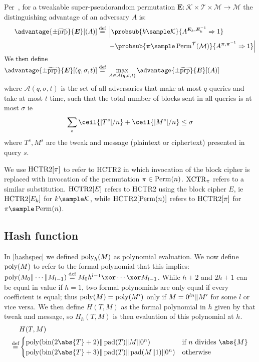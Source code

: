 \documentclass[hctr.tex]{subfiles}
\begin{document}
Per~\cite{cmc}, for a tweakable super-pseudorandom permutation
$\bm{E} : \mathcal{K} \times \mathcal{T} \times \mathcal{M} \rightarrow \mathcal{M}$
the distinguishing advantage of an adversary $A$ is:
%
\begin{align*}
    \advantage{\pm \widetilde{\mathrm{prp}}}{\bm{E}}[(A)] \defeq
    {}&\left\lvert\probsub{k \sample \mathcal{K}}{A^{\bm{E}_k,\bm{E}_k^{-1}}\Rightarrow 1}\right.
    \\
    {}&\left. - \probsub{\bm{\pi} \sample \Perm^\mathcal{T}(\mathcal{M})}
        {A^{\bm{\pi},\bm{\pi}^{-1}}\Rightarrow 1}\right\rvert
    \\
    \intertext{We then define}
    \advantage{\pm \widetilde{\mathrm{prp}}}{\bm{E}}[(q, \sigma, t)]
    \defeq {}&
    \max_{A \in \mathcal{A}(q, \sigma, t)} \advantage{\pm \widetilde{\mathrm{prp}}}{\bm{E}}[(A)]
\end{align*}
where \(\mathcal{A}(q, \sigma, t)\)
is the set of all adversaries 
that make at most \(q\) queries
and take at most \(t\) time,
such that the total number of blocks sent in all queries is
at most \(\sigma\) ie
\begin{displaymath}
    \sum_s \ceil{|T^s|/n} + \ceil{|M^s|/n} \leq \sigma
\end{displaymath}
where \(T^s, M^s\) are the tweak and message
(plaintext or ciphertext)
presented in query \(s\).

We use \(\operatorname{HCTR2}[\pi]\) to refer to HCTR2 in which invocation
of the block cipher is replaced with invocation of the
permutation \(\pi \in \operatorname{Perm}(n)\).
\(\operatorname{XCTR}_\pi\) refers to a similar substitution.
\(\operatorname{HCTR2}[E]\) refers to HCTR2 using the block cipher \(E\),
ie \(\operatorname{HCTR2}[E_k]\) for \(k \sample \mathcal{K}\), while
\(\operatorname{HCTR2}[\operatorname{Perm}(n)]\) refers to \(\operatorname{HCTR2}[\pi]\)
for \(\pi \sample \Perm(n)\).

\subsection{Hash function}\label{hproperties}
In \autoref{hashspec} we defined \(\operatorname{poly}_h(M)\) as polynomial evaluation.
We now define \(\operatorname{poly}(M)\) to refer to the formal polynomial
that this implies: \(\poly(M_0 \Concat \cdots \Concat M_{l-1})
\defeq  M_0h^{l-1} \xor \cdots \xor M_{l-1}\).
While \(h + 2\) and \(2h + 1\) can be equal
in value if \(h = 1\), two formal polynomials are only equal
if every coefficient is equal; thus \(\operatorname{poly}(M) = \operatorname{poly}(M')\)
only if \(M = 0^{ln} \Vert M'\) for some \(l\) or vice versa.
We then define \(H(T, M)\) as the formal polynomial in \(h\) given
by that tweak and message,
so \(H_h(T, M)\) is then evaluation of this polynomial at \(h\).
\begin{align*}
    & H(T, M) \\
    \defeq &
    \begin{cases}
        \poly(\fromint(2\abs{T} + 2) \Concat \pad(T) \Concat M \Concat 0^n) &
        \text{if } n \text{ divides } \abs{M} \\
        \poly(\fromint(2\abs{T} + 3) \Concat \pad(T) \Concat \pad(M \Concat 1) \Concat 0^n) &
        \text{otherwise}
    \end{cases}    \\
\end{align*}
\end{document}

